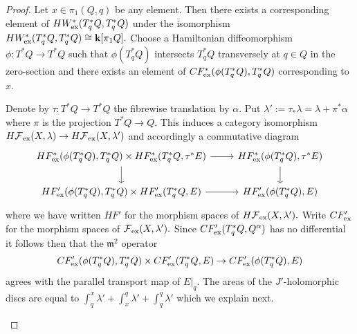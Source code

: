 \documentclass{article}
\theoremstyle{plain}%
\theoremstyle{definition}
\numberwithin{equation}{section}
\numberwithin{figure}{section}
\def\fm{{\mathfrak m}}
\def\cF{{\mathbin{\cal F}}}
\def\al{\alpha}
\def\la{\lambda}
\def\ph{\phi}
\def\ta{\tau}
\def\k{{\mathbf{k}}}\def\b{{\mathbf{b}}}\def\x{{\mathbf{x}}}
\def\ex{{   {\rm ex}    }}\def\virt{{   {\rm virt}    }}\def\ev{{\rm ev}}\def\sing{{\rm sing}}\def\cont{{\rm cont}}
\begin{document}
\begin{proof}
Let $x\in \pi_1(Q,q)$ be any element. 
Then there exists a corresponding element of $HW^*_\ex(T_q^*Q,T_q^*Q)$ under the isomorphism $HW^*_\ex(T_q^*Q,T_q^*Q)\cong \k[\pi_1Q].$
Choose a Hamiltonian diffeomorphism $\ph:T^*Q\to T^*Q$ such that $\ph(T_q^*Q)$ intersects $T_q^*Q$ transversely at $q\in Q$ in the zero-section and there exists an element of $CF^*_\ex(\ph(T_q^*Q),T_q^*Q)$ corresponding to $x.$

Denote by $\ta:T^*Q\to T^*Q$ the fibrewise translation by $\al.$ Put $\la':=\ta_*\la=\la+\pi^*\al$ where $\pi$ is the projection $T^*Q\to Q.$ This induces a category isomorphism $H\cF_\ex(X,\la)\to H\cF_\ex(X,\la')$ and accordingly a commutative diagram
\[
\begin{tikzcd}
HF_\ex^*(\ph(T_q^*Q),T_q^*Q)\times HF_\ex^*(T_q^*Q,\ta^*E)\ar[r]\ar[d]& HF_\ex^*(\ph(T_q^*Q),\ta^*E)\ar[d]\\
HF_\ex'(\ph(T_q^*Q),T_q^*Q)\times HF_\ex'(T_q^*Q,E)\ar[r]& HF_\ex'(\ph(T_q^*Q),E)
\end{tikzcd}
\]
where we have written $HF'$ for the morphism spaces of $H\cF_\ex(X,\la').$
Write $CF_\ex'$ for the morphism spaces of $\cF_\ex(X,\la').$
Since $CF_\ex'(T_q^*Q,Q^\al)$ has no differential it follows then that the $\fm^2$ operator
\[CF_\ex'(\ph(T_q^*Q),T_q^*Q)\times CF_\ex'(T_q^*Q,E)\to CF_\ex'(\ph(T_q^*Q),E)\]
agrees with the parallel transport map of $E|_q.$
The areas of the $J'$-holomorphic discs are equal to $\int_q^x\la'+\int_x^q\la'+\int_q^q\la'$ which we explain next.
\begin{figure}
  \centering
\end{figure}
\end{proof}
\end{document}
